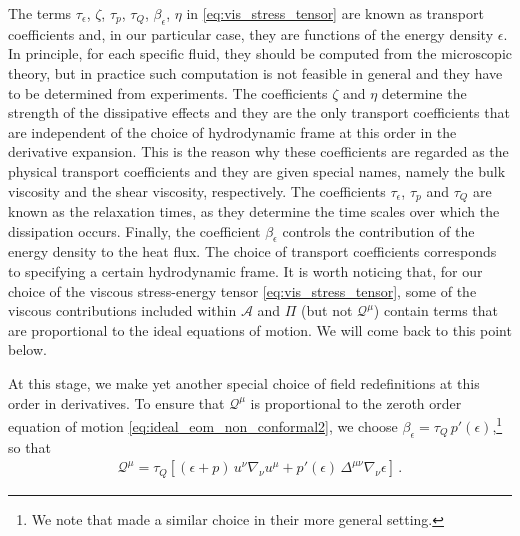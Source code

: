 \documentclass[prd,aps,twocolumn,floats,floatfix,nofootinbib,superscriptaddress] {revtex4-1}
\begin{document}
The terms $\tau_\epsilon$, $\zeta$, $\tau_p$, $\tau_Q$, $\beta_\epsilon$, $\eta$ in \eqref{eq:vis_stress_tensor} are known as transport coefficients and, in our particular case, they are functions of the energy density $\epsilon$.  In principle, for each specific fluid,  they should be computed from the microscopic theory, but in practice such computation is not feasible in general and they have to be determined from experiments. The coefficients $\zeta$ and $\eta$ determine the strength of the dissipative effects and they are the only transport coefficients that are independent of the choice of hydrodynamic frame at this order in the derivative expansion. This is the reason why these coefficients are regarded as the physical transport coefficients and they are given special names, namely the bulk viscosity and the shear viscosity, respectively. The coefficients $\tau_{\epsilon}$, $\tau_{p}$ and $\tau_{Q}$ are known as the relaxation times, as they determine the time scales over which the dissipation occurs. Finally, the coefficient $\beta_{\epsilon}$ controls the contribution of the energy density to the heat flux.  The choice of transport coefficients corresponds to specifying a certain hydrodynamic frame. It is worth noticing that, for our choice of the viscous stress-energy tensor \eqref{eq:vis_stress_tensor}, some of the viscous contributions included within $\mathcal{A}$ and $\Pi$ (but not $\mathcal{Q}^{\mu}$) contain terms that are proportional to the ideal equations of motion. We will come back to this point below. 


At this stage, we make yet another special choice of field redefinitions at this order in derivatives.  To ensure that $\mathcal{Q}^{\mu}$ is  proportional to the zeroth order equation of motion \eqref{eq:ideal_eom_non_conformal2}, we choose $\beta_\epsilon = \tau_Q\,p'(\epsilon)$,\footnote{We note that \cite{Pandya:2022sff} made a similar choice in their more general setting.}  so that 
\begin{align}
\mathcal{Q}^\mu = \tau_Q\left[(\epsilon + p)\,u^\nu\nabla_\nu u^\mu+p'(\epsilon)\,\Delta^{\mu\nu}\nabla_\nu\epsilon\right]\,.
\end{align}
\end{document}
